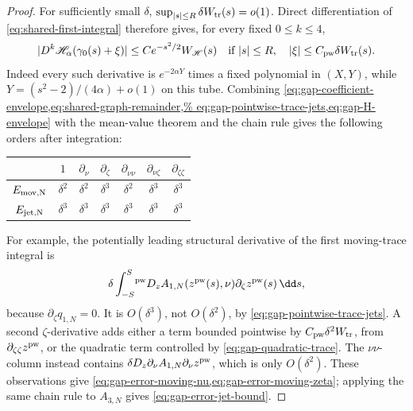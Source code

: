 \begin{proof}
For sufficiently small \(\delta\),
\(\sup_{|s|\le R}\delta W_{\rm tr}(s)=o(1)\).  Direct differentiation of
\cref{eq:shared-first-integral} therefore gives, for every fixed
\(0\le k\le4\),
 \begin{equation}
 |D^k\mathscr H_\alpha(\gamma_0(s)+\xi)|
 \le C e^{-s^2/2}W_{\mathscr H}(s)
 \quad\text{if }|s|\le R,\quad
 |\xi|\le C_{\rm pw}\delta W_{\rm tr}(s).           \label{eq:gap-H-envelope}
\end{equation}
Indeed every such derivative is \(e^{-2\alpha Y}\) times a fixed
polynomial in \((X,Y)\), while
\(Y=(s^2-2)/(4\alpha)+o(1)\) on this tube.  Combining
\cref{eq:gap-coefficient-envelope,eq:shared-graph-remainder,%
eq:gap-pointwise-trace-jets,eq:gap-H-envelope} with the mean-value theorem
and the chain rule gives the following orders after integration:
\begin{center}
\begin{tabular}{c@{\qquad}cccccc}
\toprule
 & \(1\) & \(\partial_\nu\) & \(\partial_\zeta\)
 & \(\partial_{\nu\nu}\) & \(\partial_{\nu\zeta}\)
 & \(\partial_{\zeta\zeta}\)\\
\midrule
\(E_{\rm mov,N}\)
 & \(\delta^2\) & \(\delta^2\) & \(\delta^3\)
 & \(\delta^2\) & \(\delta^3\) & \(\delta^3\)\\
\(E_{\rm jet,N}\)
 & \(\delta^3\) & \(\delta^3\) & \(\delta^3\)
 & \(\delta^3\) & \(\delta^3\) & \(\delta^3\)\\
\bottomrule
\end{tabular}
\end{center}
For example, the potentially leading structural derivative of the first
moving-trace integral is
\[
 \delta\int_{-S}^{S}\!{}^{\rm pw}
 D_zA_{1,N}(z^{\rm pw}(s),\nu)
       \partial_\zeta z^{\rm pw}(s)\,\dd s,
\]
because \(\partial_\zeta q_{1,N}=0\).  It is \(O(\delta^3)\), not
\(O(\delta^2)\), by
\cref{eq:gap-pointwise-trace-jets}.  A second \(\zeta\)-derivative adds
either a term bounded pointwise by
\(C_{\rm pw}\delta^2W_{\rm tr}\), from
\(\partial_{\zeta\zeta}z^{\rm pw}\), or the quadratic term controlled by
\cref{eq:gap-quadratic-trace}.  The \(\nu\nu\)-column
instead contains
\(\delta D_z\partial_\nu A_{1,N}\partial_\nu z^{\rm pw}\), which is only
\(O(\delta^2)\).  These observations give
\cref{eq:gap-error-moving-nu,eq:gap-error-moving-zeta}; applying the same
chain rule to \(A_{3,N}\) gives \cref{eq:gap-error-jet-bound}.


\end{proof}
